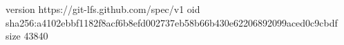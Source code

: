 version https://git-lfs.github.com/spec/v1
oid sha256:a4102ebbf1182f8acf6b8efd002737eb58b66b430e62206892099aced0c9cbdf
size 43840
